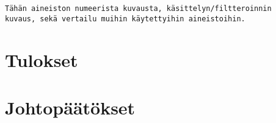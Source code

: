 \documentclass[utf8]{gradu3}
\begin{document}
\begin{verbatim}
Tähän aineiston numeerista kuvausta, käsittelyn/filtteroinnin 
kuvaus, sekä vertailu muihin käytettyihin aineistoihin.
\end{verbatim}







\chapter{Tulokset} 
\chapter{Johtopäätökset}
\printbibliography
\end{document}
